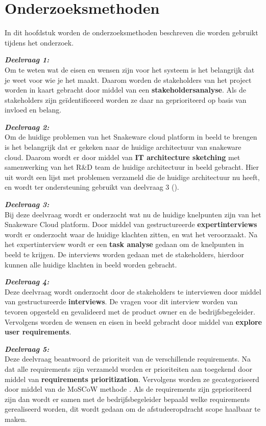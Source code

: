 \section{Onderzoeksmethoden}
In dit hoofdstuk worden de onderzoeksmethoden beschreven die worden gebruikt tijdens het onderzoek.

\whitespace[2]
\textit{\textbf{Deelvraag 1:} \SubquestionOne} \\
Om te weten wat de eisen en wensen zijn voor het systeem is het belangrijk dat je weet voor wie je het maakt.
Daarom worden de stakeholders van het project worden in kaart gebracht door middel van een \textbf{stakeholdersanalyse}.
Als de stakeholders zijn geïdentificeerd worden ze daar na geprioriteerd op basis van invloed en belang.

\whitespace[2]
\textit{\textbf{Deelvraag 2:} \SubquestionTwo} \\
Om de huidige problemen van het Snakeware cloud platform in beeld te brengen is het belangrijk dat er gekeken naar de huidige architectuur van snakeware cloud.
Daarom wordt er door middel van \textbf{IT architecture sketching} met samenwerking van het R\&D team de huidige architectuur in beeld gebracht.
Hier uit wordt een lijst met problemen verzameld die de huidige architectuur nu heeft, en wordt ter ondersteuning gebruikt van deelvraag 3 (\textit{\SubquestionThree}).

\whitespace[2]
\textit{\textbf{Deelvraag 3:} \SubquestionThree} \\
Bij deze deelvraag wordt er onderzocht wat nu de huidige knelpunten zijn van het Snakeware Cloud platform.
Door middel van gestructureerde \textbf{expertinterviews} wordt er onderzocht waar de huidige klachten zitten, en wat het veroorzaakt.
Na het expertinterview wordt er een \textbf{task analyse} gedaan om de knelpunten in beeld te krijgen.
De interviews worden gedaan met de stakeholders, hierdoor kunnen alle huidige klachten in beeld worden gebracht.

\whitespace[2]
\textit{\textbf{Deelvraag 4:} \SubquestionFour} \\
Deze deelvraag wordt onderzocht door de stakeholders te interviewen door middel van gestructureerde \textbf{interviews}.
De vragen voor dit interview worden van tevoren opgesteld en gevalideerd met de product owner en de bedrijfsbegeleider.
Vervolgens worden de wensen en eisen in beeld gebracht door middel van \textbf{explore user requirements}.

\whitespace[2]
\textit{\textbf{Deelvraag 5:} \SubquestionFive} \\
Deze deelvraag beantwoord de prioriteit van de verschillende requirements.
Na dat alle requirements zijn verzameld worden er prioriteiten aan toegekend door middel van \textbf{requirements prioritization}.
Vervolgens worden ze  gecategoriseerd door middel van de MoSCoW methode \Parencite{MoSCoW}.
Als de requirements zijn geprioriteerd zijn dan wordt er samen met de bedrijfsbegeleider bepaald welke requirements gerealiseerd worden, dit wordt gedaan om de afstudeeropdracht scope haalbaar te maken.

